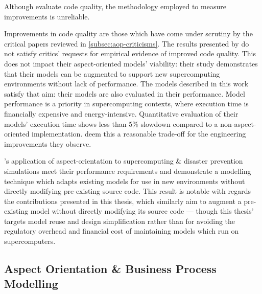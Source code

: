 Although \citet{ionescu2009aspect} evaluate code quality, the methodology
employed to measure improvements is unreliable.

Improvements in code quality are those which have come under scrutiny by the
critical papers reviewed in \cref{subsec:aop-criticisms}. The results presented
by \citeauthor{ionescu2009aspect} do not satisfy critics' requests for empirical
evidence of improved code quality. This does not impact their aspect-oriented
models' viability: their study demonstrates that their models can be augmented
to support new supercomputing environments without lack of performance. The
models described in this work satisfy that aim: their models are also evaluated
in their performance. Model performance is a priority in supercomputing
contexts, where execution time is financially expensive and energy-intensive.
Quantitative evaluation of their models' execution time shows less than 5\%
slowdown compared to a non-aspect-oriented implementation.
\citeauthor{ionescu2009aspect} deem this a reasonable trade-off for the
engineering improvements they observe.

\citeauthor{ionescu2009aspect}'s application of aspect-orientation to
supercomputing \& disaster prevention simulations meet their performance
requirements and demonstrate a modelling technique which adapts existing models
for use in new environments without directly modifying pre-existing source code.
This result is notable with regards the contributions presented in this thesis, which
similarly aim to augment a pre-existing model without directly modifying its
source code --- though this thesis' targets model reuse and design
simplification rather than for avoiding the regulatory overhead and financial
cost of maintaining models which run on supercomputers.








\subsection{Aspect Orientation \& Business Process Modelling}\label{subsec:ao_and_bpm_review}



